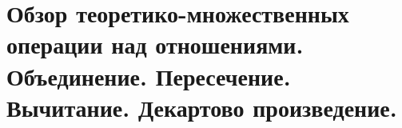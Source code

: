 {
	\section{Обзор теоретико-множественных операции над отношениями. Объединение. Пересечение. Вычитание. Декартово произведение.}
	\newpage
}
